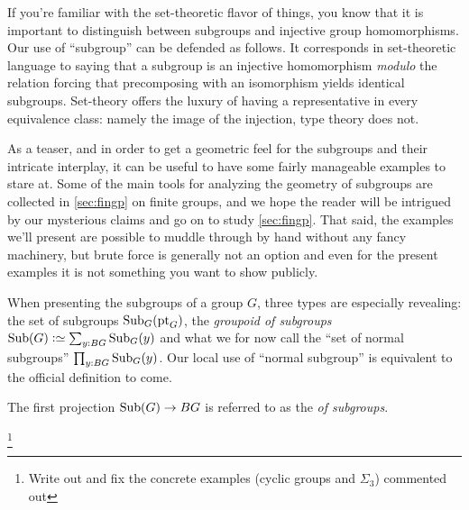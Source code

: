 \begin{remark}
  If you're familiar with the set-theoretic flavor of things, you know that it is important to distinguish between subgroups and injective group homomorphisms.  
Our use of ``subgroup'' can be defended as follows.  
It corresponds in set-theoretic language to saying that a subgroup is an injective homomorphism \emph{modulo} the relation forcing that precomposing with an isomorphism yields identical subgroups.  
Set-theory offers the luxury of having a representative in every equivalence class: namely the image of the injection, type theory does not.
\end{remark}

\label{smallsubgpex}

As a teaser, and in order to get a geometric feel for the subgroups and their intricate interplay, it can be useful to have some fairly manageable examples to stare at.  
Some of the main tools for analyzing the geometry of subgroups are collected in \cref{sec:fingp} on finite groups, and we hope the reader will be intrigued by our mysterious claims and go on to study \cref{sec:fingp}.
That said, the examples we'll present are possible to muddle through by hand without any fancy machinery, but brute force is generally not an option and even for the present examples it is not something you want to show publicly.

When presenting the subgroups of a group $G$, three types are especially revealing: the set of subgroups $\mathrm{Sub}_G(\mathrm{pt}_G)$, the \emph{groupoid of subgroups} $\typesubgroup(G)\defequi\sum_{y:BG}\typesubgroup_G(y)$ and what we for now call the ``set of normal subgroups'' $\prod_{y:BG}\mathrm{Sub}_G(y)$.   Our local use of ``normal subgroup'' is equivalent to the official definition to come.  

The first projection $\mathrm{Sub}(G)\to BG$ is referred to as the \emph{\covering of subgroups}.

\footnote{Write out and fix the concrete examples (cyclic groups and $\Sigma_3$) commented out}

